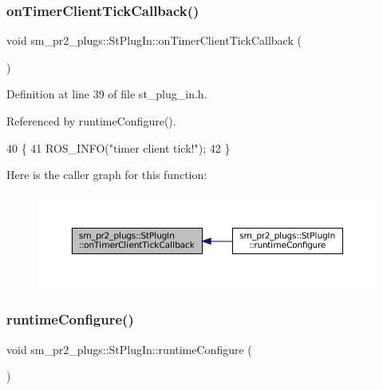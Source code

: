 \subsubsection{\texorpdfstring{on\+Timer\+Client\+Tick\+Callback()}{onTimerClientTickCallback()}}
{\footnotesize\ttfamily void sm\+\_\+pr2\+\_\+plugs\+::\+St\+Plug\+In\+::on\+Timer\+Client\+Tick\+Callback (\begin{DoxyParamCaption}{ }\end{DoxyParamCaption})\hspace{0.3cm}{\ttfamily [inline]}}



Definition at line 39 of file st\+\_\+plug\+\_\+in.\+h.



Referenced by runtime\+Configure().


\begin{DoxyCode}
40     \{
41         ROS\_INFO(\textcolor{stringliteral}{"timer client tick!"});
42     \}
\end{DoxyCode}
Here is the caller graph for this function\+:
\nopagebreak
\begin{figure}[H]
\begin{center}
\leavevmode
\includegraphics[width=350pt]{structsm__pr2__plugs_1_1StPlugIn_a1748462c4026a2df5be52e38a429560b_icgraph}
\end{center}
\end{figure}
\mbox{\label{structsm__pr2__plugs_1_1StPlugIn_a21411a3a1c4fa85a7bad312cf01b0d9a}} 
\subsubsection{\texorpdfstring{runtime\+Configure()}{runtimeConfigure()}}
{\footnotesize\ttfamily void sm\+\_\+pr2\+\_\+plugs\+::\+St\+Plug\+In\+::runtime\+Configure (\begin{DoxyParamCaption}{ }\end{DoxyParamCaption})\hspace{0.3cm}{\ttfamily [inline]}}



